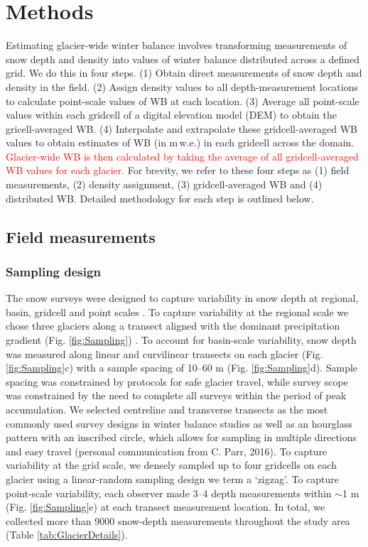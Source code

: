 \documentclass[review,oneside, letterpaper]{igs}
\begin{document}


\section{Methods}

Estimating glacier-wide winter balance involves transforming measurements of snow depth and density into values of winter balance distributed across a defined grid. We do this in four steps. (1) Obtain direct measurements of snow depth and density in the field. (2) Assign density values to all depth-measurement locations to calculate point-scale values of WB at each location. (3) Average all point-scale  values within each gridcell of a digital elevation model (DEM) to obtain the gricell-averaged WB. (4) Interpolate and extrapolate these gridcell-averaged WB values to obtain estimates of WB (in m\,w.e.) in each gridcell across the domain. \textcolor{red}{Glacier-wide WB is then calculated by taking the average of all gridcell-averaged WB values for each glacier. }For brevity, we refer to these four steps as (1) field measurements, (2) density assignment, (3) gridcell-averaged WB and (4) distributed WB. Detailed methodology for each step is outlined below.

\subsection{Field measurements}

\subsubsection{Sampling design}

The snow surveys were designed to capture variability in snow depth at regional, basin, gridcell and point scales \citep{Clark2011}. To capture variability at the regional scale we chose three glaciers along a transect aligned with the dominant precipitation gradient  (Fig. \ref{fig:Sampling}) \citep{Taylor1969}. To account for basin-scale variability, snow depth was measured along linear and curvilinear transects on each glacier (Fig. \ref{fig:Sampling}c) with a sample spacing of 10--60 m (Fig. \ref{fig:Sampling}d). Sample spacing was constrained by protocols for safe glacier travel, while survey scope was constrained by the need to complete all surveys within the period of peak accumulation. We selected centreline and transverse transects as the most commonly used survey designs in winter balance studies \citep[e.g.][]{Kaser2003, Machguth2006} as well as an hourglass pattern with an inscribed circle, which allows for sampling in multiple directions and easy travel (personal communication from C. Parr, 2016). To capture variability at the grid scale, we densely sampled up to four gridcells on each glacier using a linear-random sampling design we term a `zigzag'. To capture point-scale variability, each observer made 3--4 depth measurements within $\sim$1 m (Fig. \ref{fig:Sampling}e) at each transect measurement location. In total, we collected more than 9000 snow-depth measurements throughout the study area (Table \ref {tab:GlacierDetails}). 
\end{document}
